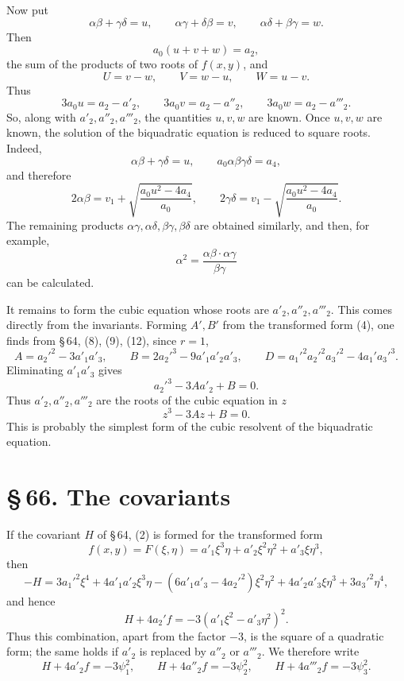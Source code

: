 \documentclass[11pt]{article}
\providecommand{\sect}[2]{\section*{\S\,#1. #2}}
\begin{document}
Now put
\begin{equation}
 \alpha\beta+\gamma\delta=u,
 \qquad
 \alpha\gamma+\delta\beta=v,
 \qquad
 \alpha\delta+\beta\gamma=w.
\tag{9}
\end{equation}
Then
\[
 a_0(u+v+w)=a_2,
\]
the sum of the products of two roots of $f(x,y)$, and
\[
 U=v-w,
 \qquad
 V=w-u,
 \qquad
 W=u-v.
\]
Thus
\begin{equation}
 3a_0u=a_2-a'_2,
 \qquad
 3a_0v=a_2-a''_2,
 \qquad
 3a_0w=a_2-a'''_2.
\tag{10}
\end{equation}
So, along with $a'_2,a''_2,a'''_2$, the quantities $u,v,w$ are known. Once $u,v,w$ are known, the solution of the biquadratic equation is reduced to square roots. Indeed,
\[
 \alpha\beta+\gamma\delta=u,
 \qquad
 a_0\alpha\beta\gamma\delta=a_4,
\]
and therefore
\[
 2\alpha\beta=v_1+\sqrt{\frac{a_0u^2-4a_4}{a_0}},
 \qquad
 2\gamma\delta=v_1-\sqrt{\frac{a_0u^2-4a_4}{a_0}}.
\]
The remaining products $\alpha\gamma,\alpha\delta,\beta\gamma,\beta\delta$ are obtained similarly, and then, for example,
\[
 \alpha^2=\frac{\alpha\beta\cdot\alpha\gamma}{\beta\gamma}
\]
can be calculated.

It remains to form the cubic equation whose roots are $a'_2,a''_2,a'''_2$. This comes directly from the invariants. Forming $A',B'$ from the transformed form (4), one finds from \S\,64, (8), (9), (12), since $r=1$,
\begin{equation}
 A=a_2'^2-3a'_1a'_3,
 \qquad
 B=2a_2'^3-9a'_1a'_2a'_3,
 \qquad
 D=a_1'^2a_2'^2a_3'^2-4a_1'a_3'^3.
\tag{11}
\end{equation}
Eliminating $a'_1a'_3$ gives
\[
 a_2'^3-3Aa'_2+B=0.
\]
Thus $a'_2,a''_2,a'''_2$ are the roots of the cubic equation in $z$
\begin{equation}
 z^3-3Az+B=0.
\tag{12}
\end{equation}
This is probably the simplest form of the cubic resolvent of the biquadratic equation.

\sect{66}{The covariants}

If the covariant $H$ of \S\,64, (2) is formed for the transformed form
\begin{equation}
 f(x,y)=F(\xi,\eta)=a'_1\xi^3\eta+a'_2\xi^2\eta^2+a'_3\xi\eta^3,
\tag{1}
\end{equation}
then
\begin{equation}
 -H=3a_1'^2\xi^4+4a'_1a'_2\xi^3\eta-(6a'_1a'_3-4a_2'^2)\xi^2\eta^2+4a'_2a'_3\xi\eta^3+3a_3'^2\eta^4,
\tag{2}
\end{equation}
and hence
\begin{equation}
 H+4a_2'f=-3(a'_1\xi^2-a'_3\eta^2)^2.
\tag{3}
\end{equation}
Thus this combination, apart from the factor $-3$, is the square of a quadratic form; the same holds if $a'_2$ is replaced by $a''_2$ or $a'''_2$. We therefore write
\begin{equation}
 H+4a'_2f=-3\psi_1^2,
 \qquad
 H+4a''_2f=-3\psi_2^2,
 \qquad
 H+4a'''_2f=-3\psi_3^2.
\tag{4}
\end{equation}
\end{document}

